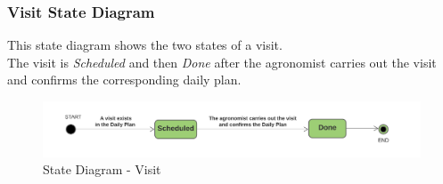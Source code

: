 \subsubsection{Visit State Diagram}
This state diagram shows the two states of a visit.\\
The visit is \textit{Scheduled} and then \textit{Done} after the agronomist carries out the visit and confirms the corresponding daily plan.
\begin{figure}[h!]
  \includegraphics[width=\textwidth,height=\textheight,keepaspectratio]{./Images/State Chart Visit.png}
  \caption{State Diagram - Visit}
\end{figure}

